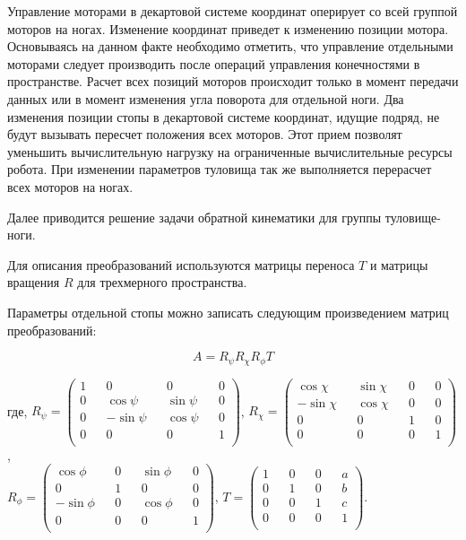 Управление моторами в декартовой системе координат оперирует со всей группой моторов на ногах. Изменение координат приведет к изменению позиции мотора. Основываясь на данном факте необходимо отметить, что управление отдельными моторами следует производить после операций управления конечностями в пространстве. Расчет всех позиций моторов происходит только в момент передачи данных или в момент изменения угла поворота для отдельной ноги. Два изменения позиции стопы в декартовой системе координат, идущие подряд, не будут вызывать пересчет положения всех моторов. Этот прием позволят уменьшить вычислительную нагрузку на ограниченные вычислительные ресурсы робота. При изменении параметров туловища  так же выполняется перерасчет всех моторов на ногах.

Далее приводится решение задачи обратной кинематики для группы туловище-ноги. 

Для описания преобразований используются матрицы переноса $T$ и матрицы вращения $R$ для трехмерного пространства.

Параметры отдельной стопы можно записать следующим произведением матриц преобразований:

\begin{equation}
A = R_{\psi} R_{\chi} R_{\phi} T
\end{equation}

\noindent где,
$ R_{\psi} = \begin{pmatrix}
1 && 0 && 0 && 0 \\
0 && \cos \psi &&  \sin \psi && 0 \\
0 && -\sin \psi && \cos \psi && 0 \\
0 && 0 && 0 && 1 \\
\end{pmatrix}$,
$ R_{\chi} = \begin{pmatrix}
\cos \chi &&  \sin \chi && 0 && 0 \\
-\sin \chi && \cos \chi && 0 && 0 \\
0 && 0 && 1 && 0 \\
0 && 0 && 0 && 1 \\
\end{pmatrix}$, \\
$ R_{\phi} = \begin{pmatrix}
\cos \phi &&  0 && \sin \phi && 0 \\
0 && 1 && 0 && 0 \\
-\sin \phi && 0 && \cos \phi && 0 \\
0 && 0 && 0 && 1 \\
\end{pmatrix}$,
$ T = \begin{pmatrix}
1 && 0 && 0 && a \\
0 && 1 && 0 && b \\
0 && 0 && 1 && c \\
0 && 0 && 0 && 1 \\
\end{pmatrix}$.

